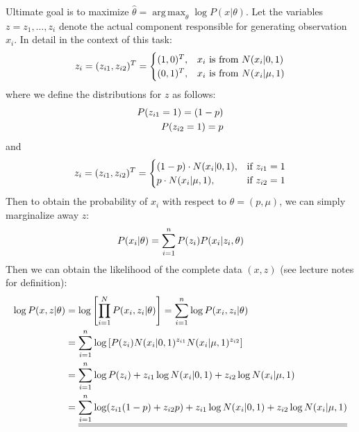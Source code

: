 \documentclass[12pt]{article}
\DeclareMathOperator*{\argmax}{arg\,max}
\begin{document}
    Ultimate goal is to maximize $\hat{\theta} = \argmax_\theta \log P(x|\theta)$. Let the variables $z={z_1, \ldots, z_i}$ denote the actual component responsible for generating observation $x_i$. In detail in the context of this task:
    \begin{align*}
        z_i = ({z_{i1}}, {z_{i2}})^T = 
        \begin{cases}
            (1,0)^T, &\text{$x_i$ is from} \ N(x_i|0,1) \\
            (0,1)^T, &\text{$x_i$ is from} \ N(x_i|\mu,1)
        \end{cases}
    \end{align*}
    where we define the distributions for $z$ as follows:
    \begin{align*}
        P({z_{i1}} = 1) = (1-p) \\ 
        P({z_{i2}} = 1) = p  
    \end{align*}
    and
    \begin{align*}
        z_i = ({z_{i1}}, {z_{i2}})^T = 
        \begin{cases}
            (1-p) \cdot N(x_i|0,1), &\text{if} \ {z_{i1}} = 1\\
            p \cdot N(x_i|\mu,1), &\text{if} \ {z_{i2}} = 1
        \end{cases}
    \end{align*}
    Then to obtain the probability of $x_i$ with respect to $\theta=(p, \mu)$, we can simply marginalize away $z$:
    \begin{align*}
        P(x_i|\theta) = \sum\limits_{i=1}^{n} P(z_i) P(x_i|z_i, \theta)
    \end{align*}
    Then we can obtain the likelihood of the complete data $(x, z)$ (see lecture notes for definition):
    \begin{align}
        \log P(x,z|\theta) &= \log \left[\prod\limits_{i=1}^{N} P(x_i, z_i|\theta)\right] = \sum\limits_{i=1}^{n} \log P(x_i, z_i|\theta)\\
        &= \sum\limits_{i=1}^{n} \log \left[P(z_i) N(x_i|0,1)^{z_{i1}} N(x_i|\mu,1)^{z_{i2}}\right] \\
        &= {\sum\limits_{i=1}^{n} \log P(z_i) + {z_{i1}} \log N(x_i|0,1) + {z_{i2}} \log N(x_i|\mu,1)} \\ 
        &= \underline{\underline{\sum\limits_{i=1}^{n} \log ({z_{i1}}(1-p)+{z_{i2}} p) + {z_{i1}} \log N(x_i|0,1) + {z_{i2}} \log N(x_i|\mu,1)}}
    \end{align}
\end{document}
